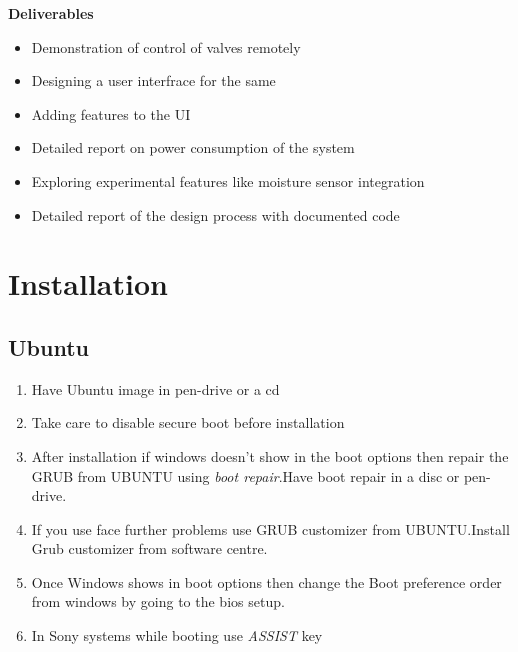 \documentclass[16pt]{article}
\begin{document}
   \vspace{0.6cm}
   
  {\textbf{Deliverables}}
  
\begin{itemize}
\item Demonstration of control of valves remotely
\item Designing a user interfrace for the same 
\item Adding features to the UI 
\item Detailed report on power consumption of the system
\item Exploring experimental features like moisture sensor integration
\item Detailed report of the design process with documented code
\end{itemize}

\vspace{8cm}

\section{Installation}
 
\vspace{1cm}                                    %


 
\subsection{Ubuntu}

\hfill
  \begin{enumerate}
  \item
    Have Ubuntu image in pen-drive or a cd
  \item
    Take care to disable secure boot before installation
  \item
    After installation if windows doesn't show in the boot options then
    repair the GRUB from UBUNTU using \emph{boot repair}.Have boot repair in a disc or pen-drive.
  \item
    If you use face further problems use GRUB customizer from UBUNTU.Install Grub customizer from software centre.
  \item
    Once Windows shows in boot options then change the Boot preference
    order from windows by going to the bios setup.
  \item
    In Sony systems while booting use \emph{ASSIST} key
  \end{enumerate}
  
\end{document}
